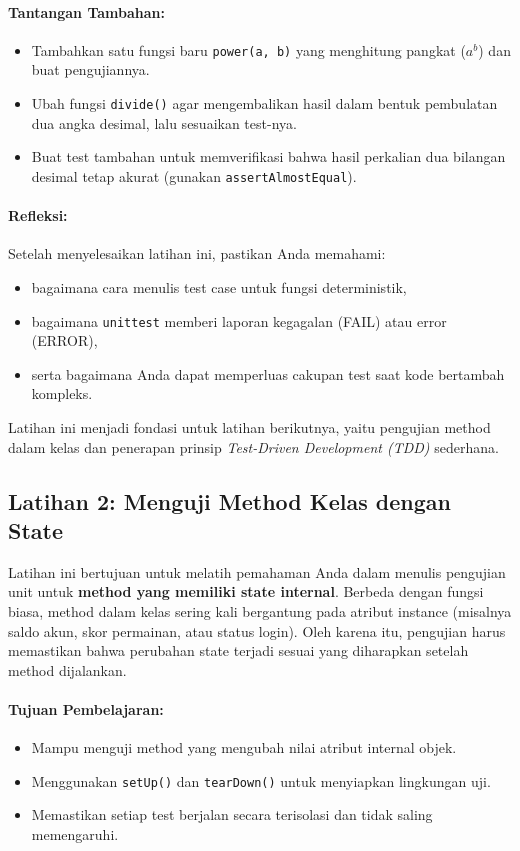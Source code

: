 \paragraph{Tantangan Tambahan:}
\begin{itemize}
    \item Tambahkan satu fungsi baru \texttt{power(a, b)} yang menghitung pangkat (\( a^b \)) dan buat pengujiannya.
    \item Ubah fungsi \texttt{divide()} agar mengembalikan hasil dalam bentuk pembulatan dua angka desimal, lalu sesuaikan test-nya.
    \item Buat test tambahan untuk memverifikasi bahwa hasil perkalian dua bilangan desimal tetap akurat (gunakan \texttt{assertAlmostEqual}).
\end{itemize}

\paragraph{Refleksi:}
Setelah menyelesaikan latihan ini, pastikan Anda memahami:
\begin{itemize}
    \item bagaimana cara menulis test case untuk fungsi deterministik,
    \item bagaimana \texttt{unittest} memberi laporan kegagalan (FAIL) atau error (ERROR),
    \item serta bagaimana Anda dapat memperluas cakupan test saat kode bertambah kompleks.
\end{itemize}

Latihan ini menjadi fondasi untuk latihan berikutnya, yaitu pengujian method dalam kelas dan penerapan prinsip \textit{Test-Driven Development (TDD)} sederhana.



\subsection*{Latihan 2: Menguji Method Kelas dengan State}

Latihan ini bertujuan untuk melatih pemahaman Anda dalam menulis pengujian unit untuk \textbf{method yang memiliki state internal}.  
Berbeda dengan fungsi biasa, method dalam kelas sering kali bergantung pada atribut instance (misalnya saldo akun, skor permainan, atau status login).  
Oleh karena itu, pengujian harus memastikan bahwa perubahan state terjadi sesuai yang diharapkan setelah method dijalankan.

\paragraph{Tujuan Pembelajaran:}
\begin{itemize}
    \item Mampu menguji method yang mengubah nilai atribut internal objek.
    \item Menggunakan \texttt{setUp()} dan \texttt{tearDown()} untuk menyiapkan lingkungan uji.
    \item Memastikan setiap test berjalan secara terisolasi dan tidak saling memengaruhi.
\end{itemize}

